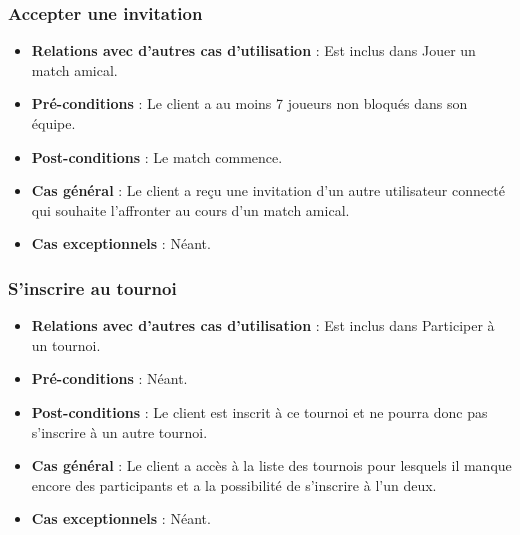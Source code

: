 \documentclass[a4paper,titlepage]{scrreprt}
\begin{document}
    \subsubsection{Accepter une invitation}
      \begin{itemize}
        \item \textbf{Relations avec d'autres cas d'utilisation}  : Est inclus dans Jouer un match amical.
        \item \textbf{Pré-conditions} : Le client a au moins 7 joueurs non bloqués dans son équipe.
        \item \textbf{Post-conditions} : Le match commence.
        \item \textbf{Cas général} : Le client a reçu une invitation d'un autre utilisateur connecté qui souhaite l'affronter au cours d'un match amical.
        \item \textbf{Cas exceptionnels} : Néant.
      \end{itemize}

    \subsubsection{S'inscrire au tournoi}
      \begin{itemize}
        \item \textbf{Relations avec d'autres cas d'utilisation}  : Est inclus dans Participer à un tournoi.
        \item \textbf{Pré-conditions} : Néant.
        \item \textbf{Post-conditions} : Le client est inscrit à ce tournoi et ne pourra donc pas s'inscrire à un autre tournoi.
        \item \textbf{Cas général} : Le client a accès à la liste des tournois pour lesquels il manque encore des participants et a la possibilité de s'inscrire à l'un deux.
        \item \textbf{Cas exceptionnels} : Néant.
      \end{itemize}
\end{document}
